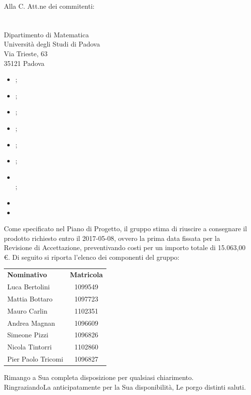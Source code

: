 \documentclass[a4paper,12pt]{letteracdp}
\begin{document}
\begin{letter}{
    Alla C. Att.ne dei commitenti: \\
    \COMMITTENTE \\
    \CARDIN      \\
    Dipartimento di Matematica \\
		Università degli Studi di Padova \\
		Via Trieste, 63 \\
		35121 Padova}
    \begin{itemize}
      \item \Gldoc{} \Glfile{};
      \item \NPdoc{} \NPfile{};
      \item \SFdoc{} \SFfile{};
      \item \PPdoc{} \PPfile{};
      \item \PQdoc{} \PQfile{};
      \item \ARdoc{} \ARfile{};
      \item \SDKdoc{} \\ \SDKfile{};
      \item {} 
      \item {} 
    \end{itemize}
    Come specificato nel Piano di Progetto, il gruppo stima di riuscire a
    consegnare il prodotto richiesto entro il 2017-05-08, ovvero la prima data
    fissata per la Revisione di Accettazione, preventivando costi per un importo
    totale di 15.063,00 \euro.
    \newpage
    Di seguito si riporta l'elenco dei componenti del gruppo:\\
    \begin{center}
      \begin{tabular}{l c}
        \textbf{Nominativo} & \textbf{Matricola} \\
        Luca Bertolini 	 	& 1099549  \\
        Mattia Bottaro 	 	& 1097723  \\
        Mauro Carlin 	 	& 1102351  \\
        Andrea Magnan    	& 1096609  \\
        Simeone Pizzi    	& 1096826  \\
        Nicola Tintorri    	& 1102860  \\
        Pier Paolo Tricomi 	& 1096827  \\
      \end{tabular}
    \end{center}
    \closing{Rimango a Sua completa disposizione per qualsiasi chiarimento. \\
	RingraziandoLa anticipatamente per la Sua disponibilità, Le porgo distinti saluti.}
  \end{letter}
\end{document}
